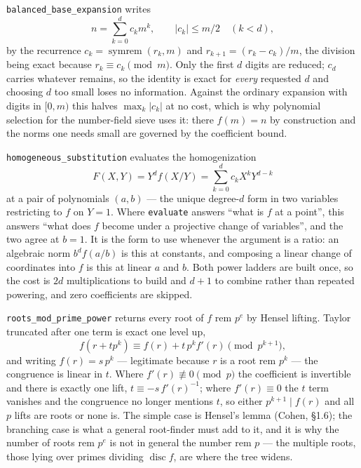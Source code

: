 \documentclass[11pt]{article}
\newcommand{\code}[1]{\texttt{#1}}
\newcommand{\disc}{\operatorname{disc}}
\begin{document}
\code{balanced\_base\_expansion} writes
\[
  n = \sum_{k=0}^{d} c_k m^k, \qquad |c_k| \le m/2 \quad (k < d),
\]
by the recurrence $c_k = \operatorname{symrem}(r_k, m)$ and
$r_{k+1} = (r_k - c_k)/m$, the division being exact because
$r_k \equiv c_k \pmod m$. Only the first $d$ digits are reduced; $c_d$
carries whatever remains, so the identity is exact for \emph{every}
requested $d$ and choosing $d$ too small loses no information. Against the
ordinary expansion with digits in $[0, m)$ this halves $\max_k |c_k|$ at no
cost, which is why polynomial selection for the number-field sieve uses it:
there $f(m) = n$ by construction and the norms one needs small are governed
by the coefficient bound.

\code{homogeneous\_substitution} evaluates the homogenization
\[
  F(X, Y) = Y^d f(X/Y) = \sum_{k=0}^{d} c_k X^k Y^{d-k}
\]
at a pair of polynomials $(a, b)$ --- the unique degree-$d$ form in two
variables restricting to $f$ on $Y = 1$. Where \code{evaluate} answers
``what is $f$ at a point'', this answers ``what does $f$ become under a
projective change of variables'', and the two agree at $b = 1$. It is the
form to use whenever the argument is a ratio: an algebraic norm
$b^d f(a/b)$ is this at constants, and composing a linear change of
coordinates into $f$ is this at linear $a$ and $b$. Both power ladders are
built once, so the cost is $2d$ multiplications to build and $d + 1$ to
combine rather than repeated powering, and zero coefficients are skipped.

\code{roots\_mod\_prime\_power} returns every root of $f$ rem $p^e$ by
Hensel lifting. Taylor truncated after one term is exact one level up,
\[
  f(r + t p^k) \equiv f(r) + t\,p^k f'(r) \pmod{p^{k+1}},
\]
and writing $f(r) = s\,p^k$ --- legitimate because $r$ is a root rem
$p^k$ --- the congruence is linear in $t$. Where
$f'(r) \not\equiv 0 \pmod p$ the coefficient is invertible and there is
exactly one lift, $t \equiv -s\,f'(r)^{-1}$; where $f'(r) \equiv 0$ the $t$
term vanishes and the congruence no longer mentions $t$, so either
$p^{k+1} \mid f(r)$ and all $p$ lifts are roots or none is. The simple case
is Hensel's lemma (Cohen, \S1.6); the branching case is what a general
root-finder must add to it, and it is why the number of roots rem $p^e$
is not in general the number rem $p$ --- the multiple roots, those lying
over primes dividing $\disc f$, are where the tree widens.
\end{document}
